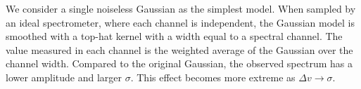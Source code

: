 \documentclass{rnaastex}
\begin{document}

We consider a single noiseless Gaussian as the simplest model. When sampled by an ideal spectrometer, where each channel is independent, the Gaussian model is smoothed with a top-hat kernel with a width equal to a spectral channel.  The value measured in each channel is the weighted average of the Gaussian over the channel width. Compared to the original Gaussian, the observed spectrum has a lower amplitude and larger $\sigma$.  This effect becomes more extreme as $\Delta v \rightarrow \sigma$.

\end{document}
